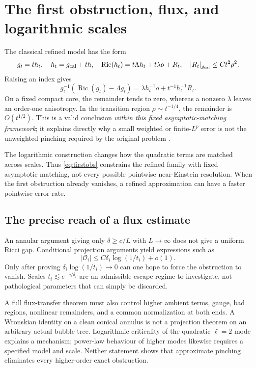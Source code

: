 \documentclass[a4paper,11pt]{article}
\numberwithin{equation}{section}
\theoremstyle{definition}
\newcommand{\Ric}{\operatorname{Ric}}
\begin{document}
\section{The first obstruction, flux, and logarithmic scales}
The classical refined model has the form
\[
g_t=t h_t,\quad h_t=g_{\rm cal}+th,\quad
\Ric(h_t)=t\Lambda h_t+t\lambda o+R_t,
\quad |R_t|_{g_{\rm cal}}\le Ct^2\rho^2.
\]
Raising an index gives
\begin{equation}\label{eq:firstobs}
g_t^{-1}(\Ric(g_t)-\Lambda g_t)
=\lambda h_t^{-1}o+t^{-1}h_t^{-1}R_t.
\end{equation}
On a fixed compact core, the remainder tends to zero, whereas a nonzero $\lambda$ leaves an order-one anisotropy. In the transition region $\rho\sim t^{-1/4}$, the remainder is $O(t^{1/2})$. This is a valid conclusion \emph{within this fixed asymptotic-matching framework}; it explains directly why a small weighted or finite-$L^p$ error is not the unweighted pinching required by the original problem \cite{MV,Biquard}.

The logarithmic construction changes how the quadratic terms are matched across scales. Thus \eqref{eq:firstobs} constrains the refined family with fixed asymptotic matching, not every possible pointwise near-Einstein resolution. When the first obstruction already vanishes, a refined approximation can have a faster pointwise error rate.

\subsection{The precise reach of a flux estimate}
An annular argument giving only $\delta\ge c/L$ with $L\to\infty$ does not give a uniform Ricci gap. Conditional projection arguments yield expressions such as
\[
|\mathcal O_i|\le C\delta_i\log(1/t_i)+o(1).
\]
Only after proving $\delta_i\log(1/t_i)\to0$ can one hope to force the obstruction to vanish. Scales $t_i\lesssim e^{-c/\delta_i}$ are an admissible escape regime to investigate, not pathological parameters that can simply be discarded.

A full flux-transfer theorem must also control higher ambient terms, gauge, bad regions, nonlinear remainders, and a common normalization at both ends. A Wronskian identity on a clean conical annulus is not a projection theorem on an arbitrary actual bubble tree. Logarithmic criticality of the quadratic $\ell=2$ mode explains a mechanism; power-law behaviour of higher modes likewise requires a specified model and scale. Neither statement shows that approximate pinching eliminates every higher-order exact obstruction.
\end{document}
